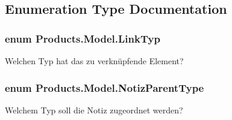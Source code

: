 \subsection{Enumeration Type Documentation}
\subsubsection[{\texorpdfstring{Link\+Typ}{LinkTyp}}]{\setlength{\rightskip}{0pt plus 5cm}enum {\bf Products.\+Model.\+Link\+Typ}\hspace{0.3cm}{\ttfamily [strong]}}\hypertarget{namespace_products_1_1_model_a0ea8a130b9a610541b442971b91cbc31}{}\label{namespace_products_1_1_model_a0ea8a130b9a610541b442971b91cbc31}


Welchen Typ hat das zu verknüpfende Element? 

\subsubsection[{\texorpdfstring{Notiz\+Parent\+Type}{NotizParentType}}]{\setlength{\rightskip}{0pt plus 5cm}enum {\bf Products.\+Model.\+Notiz\+Parent\+Type}\hspace{0.3cm}{\ttfamily [strong]}}\hypertarget{namespace_products_1_1_model_aa53a12ac8a17bed12c76a466aeeba94d}{}\label{namespace_products_1_1_model_aa53a12ac8a17bed12c76a466aeeba94d}


Welchem Typ soll die Notiz zugeordnet werden? 

